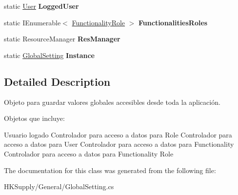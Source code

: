 \begin{DoxyCompactItemize}
\item 
\mbox{\label{class_h_k_supply_1_1_general_1_1_global_setting_adeb470418d2461437e6dc55fd41f78f5}} 
static \hyperlink{class_h_k_supply_1_1_models_1_1_user}{User} {\bfseries Logged\+User}
\item 
\mbox{\label{class_h_k_supply_1_1_general_1_1_global_setting_adf54b9c3d32b3dac949776dee6f17eb2}} 
static I\+Enumerable$<$ \hyperlink{class_h_k_supply_1_1_models_1_1_functionality_role}{Functionality\+Role} $>$ {\bfseries Functionalities\+Roles}
\item 
\mbox{\label{class_h_k_supply_1_1_general_1_1_global_setting_ad2628f5f55a5a8f640cd28aa425f968f}} 
static Resource\+Manager {\bfseries Res\+Manager}
\item 
\mbox{\label{class_h_k_supply_1_1_general_1_1_global_setting_afa2d235e79652e93864a33932863c1e2}} 
static \hyperlink{class_h_k_supply_1_1_general_1_1_global_setting}{Global\+Setting} {\bfseries Instance}
\end{DoxyCompactItemize}


\subsection{Detailed Description}
Objeto para guardar valores globales accesibles desde toda la aplicación. 

Objetos que incluye\+:
\begin{DoxyItemize}
\item Usuario logado Controlador para acceso a datos para Role Controlador para acceso a datos para User Controlador para acceso a datos para Functionality Controlador para acceso a datos para Functionality Role 
\end{DoxyItemize}

The documentation for this class was generated from the following file\+:\begin{DoxyCompactItemize}
\item 
H\+K\+Supply/\+General/Global\+Setting.\+cs\end{DoxyCompactItemize}
